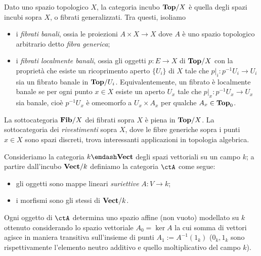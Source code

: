 \begin{example}\label{ex_fibrati_rivestimenti}
	Dato uno spazio topologico \(X\), la categoria incubo \(\mathbf{Top}/X\) è quella degli spazi incubi sopra \(X\), o fibrati generalizzati. Tra questi, isoliamo
	\begin{itemize}
		\item i \emph{fibrati banali}, ossia le proiezioni \(A\times X \to X\) dove \(A\) è uno spazio topologico arbitrario detto \emph{fibra generica};
		\item i \emph{fibrati localmente banali}, ossia gli oggetti \(p : E\to X\) di \(\mathbf{Top}/X\) con la proprietà che esiste un ricoprimento aperto \(\{U_i\}\) di \(X\) tale che \(p|_i : p^{-1}U_i\to U_i\) sia un fibrato banale in \(\mathbf{Top}/U_i\). Equivalentemente, un fibrato è localmente banale se per ogni punto \(x\in X\) esiste un aperto \(U_x\) tale che \(p|_x : p^{-1}U_x\to U_x\) sia banale, cioè \(p^{-1}U_x\) è omeomorfo a \(U_x\times A_x\) per qualche \(A_x\in\mathbf{Top}_0\).
	\end{itemize}
		      La sottocategoria \(\mathbf{Fib}/X\) dei fibrati sopra \(X\) è piena in \(\mathbf{Top}/X\). La sottocategoria dei \emph{rivestimenti} sopra \(X\), dove le fibre generiche sopra i punti \(x\in X\) sono spazi discreti, trova interessanti applicazioni in topologia algebrica.
\end{example}
\begin{example}\label{ex_affini}
	Consideriamo la categoria \(k\emdash\ctVect\) degli spazi vettoriali su un campo \(k\); a partire dall'incubo \(\mathbf{Vect}/k\) definiamo la categoria \(\ctA\) come segue:
	\begin{itemize}
		\item gli oggetti sono mappe lineari \emph{suriettive} \(A : V\to k\);
		\item i morfismi sono gli stessi di \(\mathbf{Vect}/k\).
	\end{itemize}
	Ogni oggetto di \(\ctA\) determina uno spazio affine (non vuoto) modellato su \(k\) ottenuto considerando lo spazio vettoriale \(A_0 = \ker A\) la cui somma di vettori agisce in maniera transitiva sull'insieme di punti \(A_1 := A^{-1}(1_k)\) (\(0_k,1_k\) sono rispettivamente l'elemento neutro additivo e quello moltiplicativo del campo \(k\)).
\end{example}
